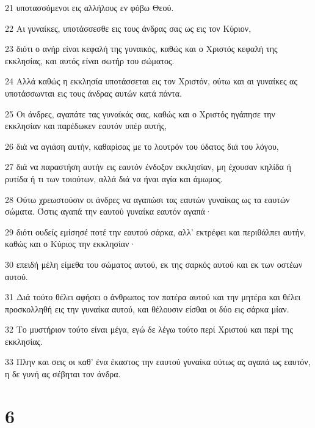 \par 21 υποτασσόμενοι εις αλλήλους εν φόβω Θεού.
\par 22 Αι γυναίκες, υποτάσσεσθε εις τους άνδρας σας ως εις τον Κύριον,
\par 23 διότι ο ανήρ είναι κεφαλή της γυναικός, καθώς και ο Χριστός κεφαλή της εκκλησίας, και αυτός είναι σωτήρ του σώματος.
\par 24 Αλλά καθώς η εκκλησία υποτάσσεται εις τον Χριστόν, ούτω και αι γυναίκες ας υποτάσσωνται εις τους άνδρας αυτών κατά πάντα.
\par 25 Οι άνδρες, αγαπάτε τας γυναίκάς σας, καθώς και ο Χριστός ηγάπησε την εκκλησίαν και παρέδωκεν εαυτόν υπέρ αυτής,
\par 26 διά να αγιάση αυτήν, καθαρίσας με το λουτρόν του ύδατος διά του λόγου,
\par 27 διά να παραστήση αυτήν εις εαυτόν ένδοξον εκκλησίαν, μη έχουσαν κηλίδα ή ρυτίδα ή τι των τοιούτων, αλλά διά να ήναι αγία και άμωμος.
\par 28 Ούτω χρεωστούσιν οι άνδρες να αγαπώσι τας εαυτών γυναίκας ως τα εαυτών σώματα. Όστις αγαπά την εαυτού γυναίκα εαυτόν αγαπά·
\par 29 διότι ουδείς εμίσησέ ποτέ την εαυτού σάρκα, αλλ' εκτρέφει και περιθάλπει αυτήν, καθώς και ο Κύριος την εκκλησίαν·
\par 30 επειδή μέλη είμεθα του σώματος αυτού, εκ της σαρκός αυτού και εκ των οστέων αυτού.
\par 31 Διά τούτο θέλει αφήσει ο άνθρωπος τον πατέρα αυτού και την μητέρα και θέλει προσκολληθή εις την γυναίκα αυτού, και θέλουσιν είσθαι οι δύο εις σάρκα μίαν.
\par 32 Το μυστήριον τούτο είναι μέγα, εγώ δε λέγω τούτο περί Χριστού και περί της εκκλησίας.
\par 33 Πλην και σεις οι καθ' ένα έκαστος την εαυτού γυναίκα ούτως ας αγαπά ως εαυτόν, η δε γυνή ας σέβηται τον άνδρα.

\chapter{6}


